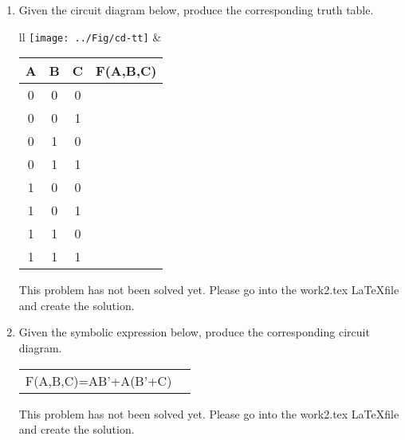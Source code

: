 \begin{enumerate}
    \item Given the circuit diagram below, produce the corresponding truth table.

        \begin{tabular}{ll}
            \texttt{[image: ../Fig/cd-tt]}
            &
            \begin{tabular}{c|c|c||c}
                A & B & C & F(A,B,C) \\ \hline \hline
                0 & 0 & 0 &   \\ \hline
                0 & 0 & 1 &   \\ \hline
                0 & 1 & 0 &   \\ \hline
                0 & 1 & 1 &   \\ \hline
                1 & 0 & 0 &   \\ \hline
                1 & 0 & 1 &   \\ \hline
                1 & 1 & 0 &   \\ \hline
                1 & 1 & 1 &   \\
            \end{tabular}
        \end{tabular}

        \begin{onlysolution}
            This problem has not been solved yet.  Please go into the work2.tex \LaTeX file and create the solution.
        \end{onlysolution}



    \item Given the symbolic expression below, produce the corresponding circuit diagram.

        \begin{tabular}{lp{2in}}
            F(A,B,C)=AB'+A(B'+C)  & \\
        \end{tabular}
        \begin{onlysolution}
            This problem has not been solved yet.  Please go into the work2.tex \LaTeX file and create the solution.
        \end{onlysolution}
        \vspace{3cm}


\end{enumerate}
